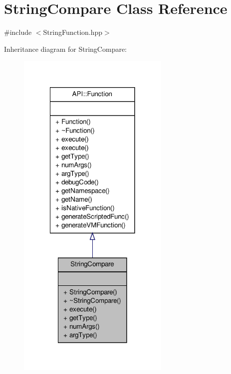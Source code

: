 \hypertarget{class_string_compare}{\section{String\-Compare Class Reference}
\label{class_string_compare}
}


{\ttfamily \#include $<$String\-Function.\-hpp$>$}



Inheritance diagram for String\-Compare\-:
\nopagebreak
\begin{figure}[H]
\begin{center}
\leavevmode
\includegraphics[width=206pt]{class_string_compare__inherit__graph}
\end{center}
\end{figure}


